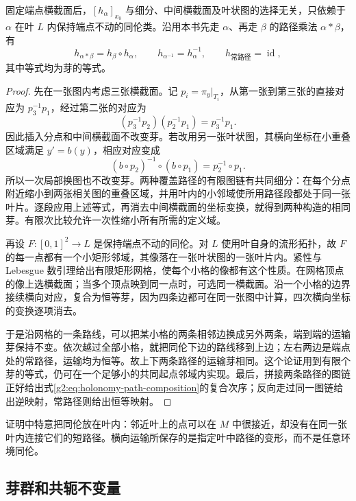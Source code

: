 \begin{proposition}\label{g2:prop:holonomy-transport}
	固定端点横截面后，\([h_\alpha]_{x_0}\) 与细分、中间横截面及叶状图的选择无关，只依赖于 \(\alpha\) 在叶 \(L\) 内保持端点不动的同伦类。沿用本书先走 \(\alpha\)、再走 \(\beta\) 的路径乘法 \(\alpha*\beta\)，有
	\begin{equation}\label{g2:eq:holonomy-path-composition}
		h_{\alpha*\beta}=h_\beta\circ h_\alpha,\qquad
		h_{\alpha^{-1}}=h_\alpha^{-1},\qquad h_{\text{常路径}}=\operatorname{id},
	\end{equation}
	其中等式均为芽的等式。
\end{proposition}
\begin{proof}
	先在一张图内考虑三张横截面。记 \(p_i=\pi_y|_{T_i}\)，从第一张到第三张的直接对应为 \(p_3^{-1}p_1\)，经过第二张的对应为
	\[
		(p_3^{-1}p_2)(p_2^{-1}p_1)=p_3^{-1}p_1.
	\]
	因此插入分点和中间横截面不改变芽。若改用另一张叶状图，其横向坐标在小重叠区域满足 \(y'=b(y)\)，相应对应变成
	\[
		(b\circ p_2)^{-1}\circ(b\circ p_1)=p_2^{-1}\circ p_1.
	\]
	所以一次局部换图也不改变芽。两种覆盖路径的有限图链有共同细分：在每个分点附近缩小到两张相关图的重叠区域，并用叶内的小邻域使所用路径段都处于同一张叶片。逐段应用上述等式，再消去中间横截面的坐标变换，就得到两种构造的相同芽。有限次比较允许一次性缩小所有所需的定义域。

	再设 \(F:[0,1]^2\to L\) 是保持端点不动的同伦。对 \(L\) 使用叶自身的流形拓扑，故 \(F\) 的每一点都有一个小矩形邻域，其像落在一张叶状图的一张叶片内。紧性与 Lebesgue 数引理给出有限矩形网格，使每个小格的像都有这个性质。在网格顶点的像上选横截面；当多个顶点映到同一点时，可选同一横截面。沿一个小格的边界接续横向对应，复合为恒等芽，因为四条边都可在同一张图中计算，四次横向坐标的变换逐项消去。

	于是沿网格的一条路线，可以把某小格的两条相邻边换成另外两条，端到端的运输芽保持不变。依次越过全部小格，就把同伦下边的路线移到上边；左右两边是端点处的常路径，运输均为恒等。故上下两条路径的运输芽相同。这个论证用到有限个芽的等式，仍可在一个足够小的共同起点邻域内实现。最后，拼接两条路径的图链正好给出式\eqref{g2:eq:holonomy-path-composition}的复合次序；反向走过同一图链给出逆映射，常路径则给出恒等映射。
\end{proof}

证明中特意把同伦放在叶内：邻近叶上的点可以在 \(M\) 中很接近，却没有在同一张叶内连接它们的短路径。横向运输所保存的是指定叶中路径的变形，而不是任意环境同伦。

\subsection{芽群和共轭不变量}
\label{g2:subsec:D01:02}

